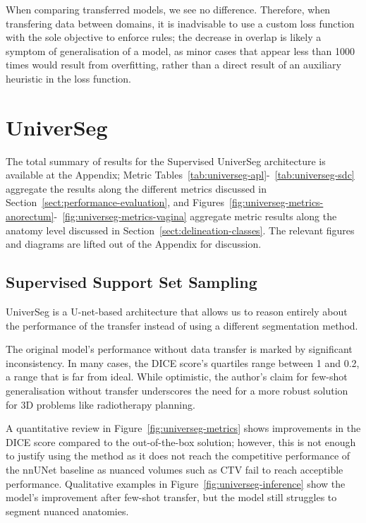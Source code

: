 \documentclass[11pt,twoside]{report}
\begin{document}
When comparing transferred models, we see no difference. Therefore, when transfering data between domains, it is inadvisable to use a custom loss function with the sole objective to enforce rules; the decrease in overlap is likely a symptom of generalisation of a model, as minor cases that appear less than 1000 times would result from overfitting, rather than a direct result of an auxiliary heuristic in the loss function. 

\clearpage

\section{UniverSeg}

The total summary of results for the Supervised UniverSeg architecture is available at the Appendix; Metric Tables~\ref{tab:universeg-apl}-~\ref{tab:universeg-sdc} aggregate the results along the different metrics discussed in Section~\ref{sect:performance-evaluation}, and Figures~\ref{fig:universeg-metrics-anorectum}-~\ref{fig:universeg-metrics-vagina} aggregate metric results along the anatomy level discussed in Section~\ref{sect:delineation-classes}. The relevant figures and diagrams are lifted out of the Appendix for discussion.

\subsection{Supervised Support Set Sampling}

UniverSeg is a U-net-based architecture that allows us to reason entirely about the performance of the transfer instead of using a different segmentation method.

The original model's performance without data transfer is marked by significant inconsistency. In many cases, the DICE score's quartiles range between 1 and 0.2, a range that is far from ideal. While optimistic, the author's claim for few-shot generalisation without transfer underscores the need for a more robust solution for 3D problems like radiotherapy planning. 

A quantitative review in Figure~\ref{fig:universeg-metrics} shows improvements in the DICE score compared to the out-of-the-box solution; however, this is not enough to justify using the method as it does not reach the competitive performance of the nnUNet baseline as nuanced volumes such as CTV fail to reach acceptible performance. Qualitative examples in Figure~\ref{fig:universeg-inference} show the model's improvement after few-shot transfer, but the model still struggles to segment nuanced anatomies.
\end{document}
